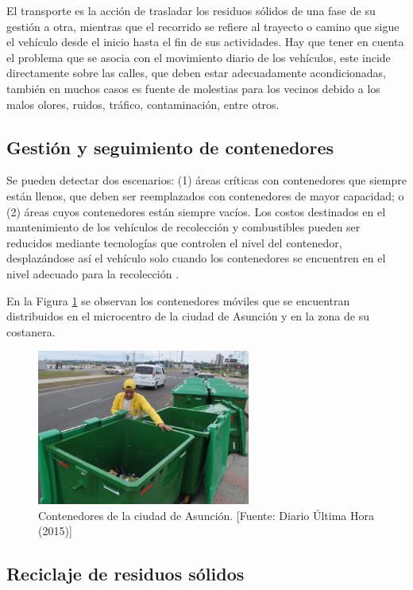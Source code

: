 El transporte es la acción de trasladar los residuos sólidos de una fase de su gestión a otra, mientras que el recorrido se refiere al trayecto o camino que sigue el vehículo desde el inicio hasta el fin de sus actividades. Hay que tener en cuenta el problema que se asocia con el movimiento diario de los vehículos, este incide directamente sobre las calles, que deben estar adecuadamente acondicionadas, también en muchos casos es fuente de molestias para los vecinos debido a los malos olores, ruidos, tráfico, contaminación, entre otros.

\subsection{Gestión y seguimiento de contenedores}

Se pueden detectar dos escenarios: (1) áreas críticas con contenedores que siempre están llenos, que deben ser reemplazados con contenedores de mayor capacidad; o (2) áreas cuyos contenedores están siempre vacíos. Los costos destinados en el mantenimiento de los vehículos de recolección y combustibles pueden ser reducidos mediante tecnologías que controlen el nivel del contenedor, desplazándose así el vehículo solo cuando los contenedores se encuentren en el nivel adecuado para la recolección \citep{VitorinodeSouzaMelare2017TechnologiesReview, Akhtar2017BacktrackingOptimization}.

En la Figura \ref{fig:contenedoresMDA} se observan los contenedores móviles que se encuentran distribuidos en el microcentro de la ciudad de Asunción y en la zona de su costanera.

\begin{figure}[H]
    \centering
    \includegraphics[width=7cm]{contenedores_mda.png}
    \caption{Contenedores de la ciudad de Asunción. [Fuente: Diario Última Hora (2015)]}
    \label{fig:contenedoresMDA}
\end{figure}

\subsection{Reciclaje de residuos sólidos}


